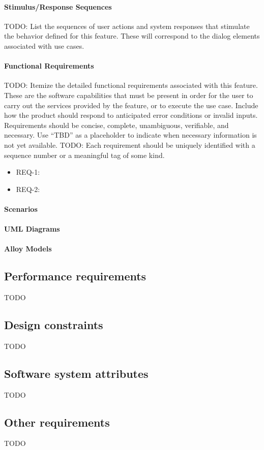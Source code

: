 \paragraph{Stimulus/Response Sequences}
TODO: List the sequences of user actions and system responses that stimulate the behavior defined for this feature. These will correspond to the dialog elements associated with use cases.
\paragraph{Functional Requirements}
TODO: Itemize the detailed functional requirements associated with this feature. These are the software capabilities that must be present in order for the user to carry out the services provided by the feature, or to execute the use case. Include how the product should respond to anticipated error conditions or invalid inputs. Requirements should be concise, complete, unambiguous, verifiable, and necessary. Use “TBD” as a placeholder to indicate when necessary information is not yet available.
TODO: Each requirement should be uniquely identified with a sequence number or a meaningful tag of some kind.
\begin{itemize}
	\item REQ-1:  
	\item REQ-2:
\end{itemize}
\paragraph{Scenarios}
\paragraph{UML Diagrams}
\paragraph{Alloy Models}
\subsection{Performance requirements}
TODO
\subsection{Design constraints}
TODO
\subsection{Software system attributes}
TODO
\subsection{Other requirements}
TODO